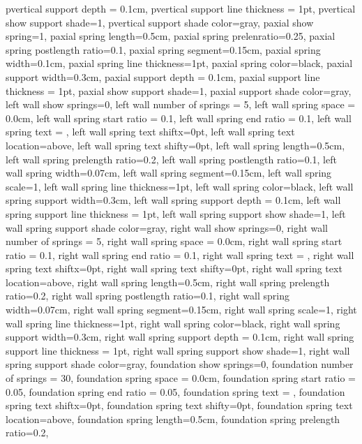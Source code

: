{{  pvertical support depth = 0.1cm,
  pvertical support line thickness = 1pt,
  pvertical show support shade=1,
  pvertical support shade color=gray,
  paxial show spring=1,
  paxial spring length=0.5cm,
  paxial spring prelenratio=0.25,
  paxial spring postlength ratio=0.1,
  paxial spring segment=0.15cm,
  paxial spring width=0.1cm,
  paxial spring line thickness=1pt,
  paxial spring color=black,
  paxial support width=0.3cm,
  paxial support depth = 0.1cm,
  paxial support line thickness = 1pt,
  paxial show support shade=1,
  paxial support shade color=gray,
  left wall show springs=0,
  left wall number of springs = 5,
  left wall spring space = 0.0cm,
  left wall spring start ratio = 0.1,
  left wall spring end ratio = 0.1,
  left wall spring text = {},
  left wall spring text shiftx=0pt,
  left wall spring text location=above,
  left wall spring text shifty=0pt,
  left wall spring length=0.5cm,
  left wall spring prelength ratio=0.2,
  left wall spring postlength ratio=0.1,
  left wall spring width=0.07cm,
  left wall spring segment=0.15cm,
  left wall spring scale=1,
  left wall spring line thickness=1pt,
  left wall spring color=black,
  left wall spring support width=0.3cm,
  left wall spring support depth = 0.1cm,
  left wall spring support line thickness = 1pt,
  left wall spring support show shade=1,
  left wall spring support shade color=gray,
  right wall show springs=0,
  right wall number of springs = 5,
  right wall spring space = 0.0cm,
  right wall spring start ratio = 0.1,
  right wall spring end ratio = 0.1,
  right wall spring text = {},
  right wall spring text shiftx=0pt,
  right wall spring text shifty=0pt,
  right wall spring text location=above,
  right wall spring length=0.5cm,
  right wall spring prelength ratio=0.2,
  right wall spring postlength ratio=0.1,
  right wall spring width=0.07cm,
  right wall spring segment=0.15cm,
  right wall spring scale=1,
  right wall spring line thickness=1pt,
  right wall spring color=black,
  right wall spring support width=0.3cm,
  right wall spring support depth = 0.1cm,
  right wall spring support line thickness = 1pt,
  right wall spring support show shade=1,
  right wall spring support shade color=gray,
  foundation show springs=0,
  foundation number of springs = 30,
  foundation spring space = 0.0cm,
  foundation spring start ratio = 0.05,
  foundation spring end ratio = 0.05,
  foundation spring text = {},
  foundation spring text shiftx=0pt,
  foundation spring text shifty=0pt,
  foundation spring text location=above,
  foundation spring length=0.5cm,
  foundation spring prelength ratio=0.2,
}}
